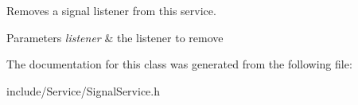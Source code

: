Removes a signal listener from this service.


\begin{DoxyParams}{Parameters}
{\em listener} & the listener to remove \\
\hline
\end{DoxyParams}


The documentation for this class was generated from the following file\+:\begin{DoxyCompactItemize}
\item 
include/\+Service/Signal\+Service.\+h\end{DoxyCompactItemize}
